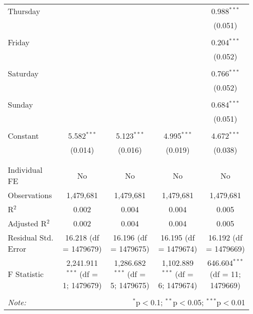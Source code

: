 \documentclass[
]{article}
\begin{document}
\begin{table}[!htbp]
{\begin{tabular}{@{\extracolsep{5pt}}lcccc}
 Thursday &  &  &  & 0.988$^{***}$ \\ 
  &  &  &  & (0.051) \\ 
  & & & & \\ 
 Friday &  &  &  & 0.204$^{***}$ \\ 
  &  &  &  & (0.052) \\ 
  & & & & \\ 
 Saturday &  &  &  & 0.766$^{***}$ \\ 
  &  &  &  & (0.052) \\ 
  & & & & \\ 
 Sunday &  &  &  & 0.684$^{***}$ \\ 
  &  &  &  & (0.051) \\ 
  & & & & \\ 
 Constant & 5.582$^{***}$ & 5.123$^{***}$ & 4.995$^{***}$ & 4.672$^{***}$ \\ 
  & (0.014) & (0.016) & (0.019) & (0.038) \\ 
  & & & & \\ 
\hline \\[-1.8ex] 
Individual FE & No & No & No & No \\ 
Observations & 1,479,681 & 1,479,681 & 1,479,681 & 1,479,681 \\ 
R$^{2}$ & 0.002 & 0.004 & 0.004 & 0.005 \\ 
Adjusted R$^{2}$ & 0.002 & 0.004 & 0.004 & 0.005 \\ 
Residual Std. Error & 16.218 (df = 1479679) & 16.196 (df = 1479675) & 16.195 (df = 1479674) & 16.192 (df = 1479669) \\ 
F Statistic & 2,241.911$^{***}$ (df = 1; 1479679) & 1,286.682$^{***}$ (df = 5; 1479675) & 1,102.889$^{***}$ (df = 6; 1479674) & 646.604$^{***}$ (df = 11; 1479669) \\ 
\hline 
\hline \\[-1.8ex] 
\textit{Note:}  & \multicolumn{4}{r}{$^{*}$p$<$0.1; $^{**}$p$<$0.05; $^{***}$p$<$0.01} \\ 
\end{tabular}
} 
\end{table} 
\newpage
\end{document}

